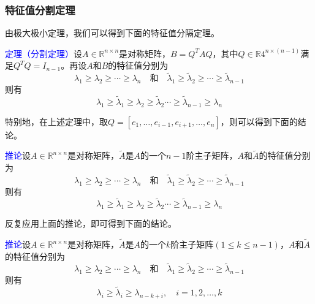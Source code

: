 \documentclass[notheorems,serif]{beamer}
\begin{document}
\begin{frame}
\frametitle{特征值分割定理}


由极大极小定理，我们可以得到下面的特征值分隔定理。

\textcolor{blue}{定理（分割定理）}\quad 设$A \in \mathbb{R}^{n \times n}$是对称矩阵，$B=Q^TAQ$，其中$Q\in \mathbb{R}4^{n \times (n-1)}$满足$Q^TQ=I_{n-1}$。再设$A$和$B$的特征值分别为$$
\lambda_{1} \geq \lambda_{2} \geq \cdots \geq \lambda_{n} \quad \text{和}  \quad \tilde{\lambda}_{1} \geq \tilde{\lambda}_{2} \geq \cdots \geq \tilde{\lambda}_{n-1}
$$则有$$
\lambda_{1} \geq \tilde{\lambda}_{1} \geq \lambda_{2} \geq \tilde{\lambda}_{2} \cdots \geq \tilde{\lambda}_{n-1} \geq \lambda_{n}
$$
\end{frame}
\begin{frame}

特别地，在上述定理中，取$Q=\left[e_{1}, \ldots, e_{i-1}, e_{i+1}, \dots, e_{n}\right]$，则可以得到下面的结论。

\textcolor{blue}{推论}\quad 设$A \in \mathbb{R}^{n \times n}$是对称矩阵，$\tilde{A}$是$A$的一个$n-1$阶主子矩阵，$A$和$\tilde{A}$的特征值分别为$$
\lambda_{1} \geq \lambda_{2} \geq \cdots \geq \lambda_{n} \quad \text{和}  \quad \tilde{\lambda}_{1} \geq \tilde{\lambda}_{2} \geq \cdots \geq \tilde{\lambda}_{n-1}
$$则有$$
\lambda_{1} \geq \tilde{\lambda}_{1} \geq \lambda_{2} \geq \tilde{\lambda}_{2} \cdots \geq \tilde{\lambda}_{n-1} \geq \lambda_{n}
$$
\end{frame}
\begin{frame}

反复应用上面的推论，即可得到下面的结论。

\textcolor{blue}{推论}\quad 设$A \in \mathbb{R}^{n \times n}$是对称矩阵，$\tilde{A}$是$A$的一个$k$阶主子矩阵$(1 \leq k \leq n-1)$，$A$和$\tilde{A}$的特征值分别为$$
\lambda_{1} \geq \lambda_{2} \geq \cdots \geq \lambda_{n} \quad \text{和}  \quad \tilde{\lambda}_{1} \geq \tilde{\lambda}_{2} \geq \cdots \geq \tilde{\lambda}_{n-1}
$$则有$$
\lambda_{i} \geq \tilde{\lambda}_{i} \geq \lambda_{n-k+i}, \quad i=1,2, \ldots, k
$$
\end{frame}
\end{document}
